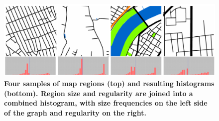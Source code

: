 \documentclass{article}
\begin{document}
%

\begin{figure}
    \centering    
\includegraphics[scale=0.55]{Images/HistSamples.png}  
\caption{\bf Four samples of map regions (top) and resulting histograms (bottom). Region size and regularity are joined into a combined histogram, with size frequencies on the left side of the graph and regularity on the right.}    
 \label{fig:mapsandHist}  
\end{figure} 
\end{document}
